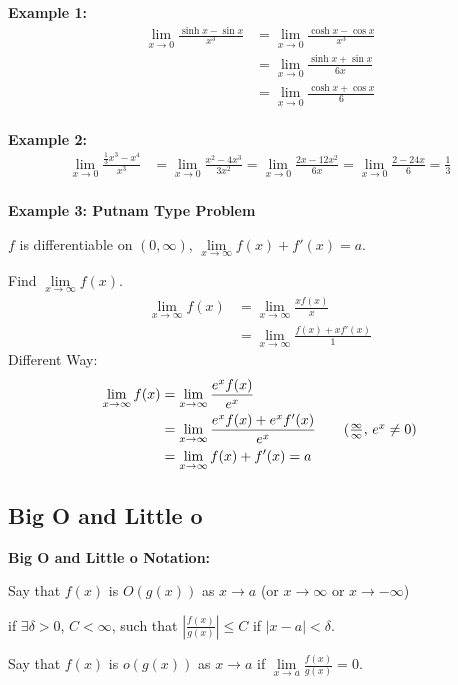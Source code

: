 \documentclass[12pt]{article}
\newcommand{\abs}[1]{\left| #1 \right|}
\theoremstyle{plain}
\newcommand{\dlim}{\displaystyle\lim\limits}
\begin{document}
	{\color{Brown}

		\textbf{Example 1: }
		\begin{align*}
			\dlim_{x\to 0} \frac{\sinh x-\sin x}{x^3} 
			&=\dlim_{x\to 0} \frac{\cosh x-\cos x}{x^3} \tag{LHR}\\
			&=\dlim_{x\to 0} \frac{\sinh x+\sin x}{6x} \tag{LHR}\\
			&=\dlim_{x\to 0} \frac{\cosh x+\cos x}6 \tag{LHR}\\
		\end{align*}
		
		\textbf{Example 2: }
		\begin{align*}
			\dlim_{x\to 0}\frac{\frac 13x^3-x^4}{x^3} 
			&=\dlim_{x\to 0}\frac{x^2-4x^3}{3x^2}
			=\dlim_{x\to 0}\frac{2x-12x^2}{6x}
			=\dlim_{x\to 0}\frac{2-24x}6
			=\frac13\\
		\end{align*}

		\textbf{Example 3: Putnam Type Problem}
		
		$f$ is differentiable on $(0,\infty)$, $\dlim_{x\to \infty} f(x)+f'(x) =a$.

		Find $\dlim_{x\to\infty} f(x)$.
		\begin{align*}
			\dlim_{x\to \infty}f(x)
			&=\dlim_{x\to\infty} \frac{xf(x)}x\\
			&=\dlim_{x\to\infty} \frac{f(x)+xf'(x)}1 
			\tag{LHR fail}
		\end{align*}
	Different Way: 
		\begin{align*}
			\dlim_{x\to \infty}f(x) 
			&=\dlim_{x\to \infty} \frac{e^xf(x)}{e^x}\\
			&=\dlim_{x\to \infty} \frac{e^xf(x)+e^xf'(x)}{e^x} 
			\tag{$\frac{\infty}{\infty}$, $e^x\neq 0$}\\
			&=\dlim_{x\to \infty} f(x)+f'(x)=a
		\end{align*}
	}

	\newpage
	\subsection{Big O and Little o}
		\textbf{Big O and Little o Notation: }

	Say that $f(x)$ is $O(g(x))$ as $x\to a$ 
	(or $x\to \infty$ or $x\to -\infty$)

	if $\exists \delta>0$, $C<\infty$, such that $\abs{\frac{f(x)}{g(x)}}\leq C$
	if $\abs{x-a}<\delta$.


	Say that $f(x)$ is $o(g(x))$ as $x\to a$ 
	if $\dlim_{x\to a}\frac{f(x)}{g(x)}=0$.
\end{document}
